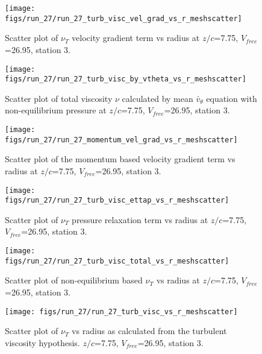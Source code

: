 \begin{figure}[H]
\centering
\texttt{[image: figs/run\_27/run\_27\_turb\_visc\_vel\_grad\_vs\_r\_meshscatter]}
\caption{Scatter plot of $\nu_T$ velocity gradient term vs radius at $z/c$=7.75, $V_{free}$=26.95, station 3.}
\end{figure}


\begin{figure}[H]
\centering
\texttt{[image: figs/run\_27/run\_27\_turb\_visc\_by\_vtheta\_vs\_r\_meshscatter]}
\caption{Scatter plot of total viscosity $\nu$ calculated by mean $\bar{v}_{\theta}$ equation with non-equilibrium pressure at $z/c$=7.75, $V_{free}$=26.95, station 3.}
\end{figure}


\begin{figure}[H]
\centering
\texttt{[image: figs/run\_27/run\_27\_momentum\_vel\_grad\_vs\_r\_meshscatter]}
\caption{Scatter plot of the momentum based velocity gradient term vs radius at $z/c$=7.75, $V_{free}$=26.95, station 3.}
\end{figure}


\begin{figure}[H]
\centering
\texttt{[image: figs/run\_27/run\_27\_turb\_visc\_ettap\_vs\_r\_meshscatter]}
\caption{Scatter plot of $\nu_T$ pressure relaxation term vs radius at $z/c$=7.75, $V_{free}$=26.95, station 3.}
\end{figure}


\begin{figure}[H]
\centering
\texttt{[image: figs/run\_27/run\_27\_turb\_visc\_total\_vs\_r\_meshscatter]}
\caption{Scatter plot of non-equilibrium based $\nu_T$ vs radius at $z/c$=7.75, $V_{free}$=26.95, station 3.}
\end{figure}


\begin{figure}[H]
\centering
\texttt{[image: figs/run\_27/run\_27\_turb\_visc\_vs\_r\_meshscatter]}
\caption{Scatter plot of $\nu_T$ vs radius as calculated from the turbulent viscosity hypothesis. $z/c$=7.75, $V_{free}$=26.95, station 3.}
\end{figure}


